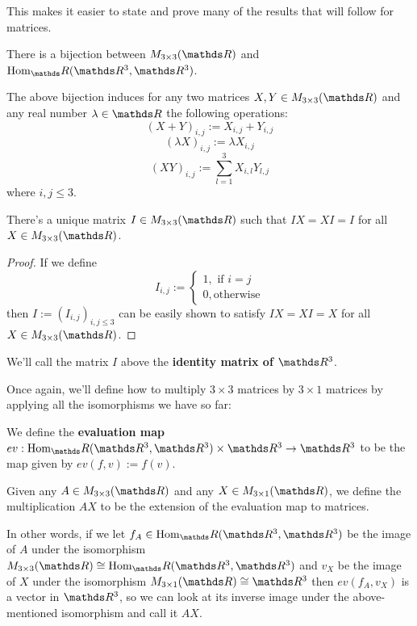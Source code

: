 This makes it easier to state and prove many of the results that will follow for matrices.

\begin{prop}
	There is a bijection between $M_{3\times 3}(\R)$ and $\hom_\R(\R^3,\R^3)$.
\end{prop}

\begin{df}
	The above bijection induces for any two matrices $X,Y\in M_{3\times 3}(\R)$ and any real number $\lambda\in \R$ the following operations:
	\[(X+Y)_{i,j}:=X_{i,j}+Y_{i,j}\]
	\[(\lambda X)_{i,j}:=\lambda X_{i,j}\]
	\[(XY)_{i,j}:=\sum_{l=1}^3X_{i,l}Y_{l,j}\]where $i,j\leq 3$.
\end{df}
\begin{lemma}
	There's a unique matrix $I\in M_{3\times 3}(\R)$ such that $IX=XI=I$ for all $X\in M_{3\times 3}(\R)$.
\end{lemma}
\begin{proof}
	If we define \[I_{i,j}:=\begin{cases}
	1, \mbox{ if }i=j\\
	0, \mbox{otherwise}
	\end{cases}\]then $I:=(I_{i,j})_{i,j\leq 3}$ can be easily shown to satisfy $IX=XI=X$ for all $X\in M_{3\times 3}(\R)$.
\end{proof}

\begin{df}
	We'll call the matrix $I$ above the \textbf{identity matrix of $\R^3$}.
\end{df}

Once again, we'll define how to multiply $3\times 3$ matrices by $3\times 1$ matrices by applying all the isomorphisms we have so far:

\begin{df}
	We define the \textbf{evaluation map} $ev:\hom_\R(\R^3,\R^3)\times\R^3\to \R^3$ to be the map given by $ev(f,v):=f(v)$.
\end{df}

\begin{df}
	Given any $A\in M_{3\times 3}(\R)$ and any $X\in M_{3\times 1}(\R)$, we define the multiplication $AX$ to be the extension of the evaluation map to matrices.
	
	In other words, if we let $f_A\in \hom_\R(\R^3,\R^3)$ be the image of $A$ under the isomorphism $M_{3\times 3}(\R)\iso\hom_\R(\R^3,\R^3)$ and $v_X$ be the image of $X$ under the isomorphism $M_{3\times 1}(\R)\iso \R^3$ then $ev(f_A,v_X)$ is a vector in $\R^3$, so we can look at its inverse image under the above-mentioned isomorphism and call it $AX$.
\end{df}

